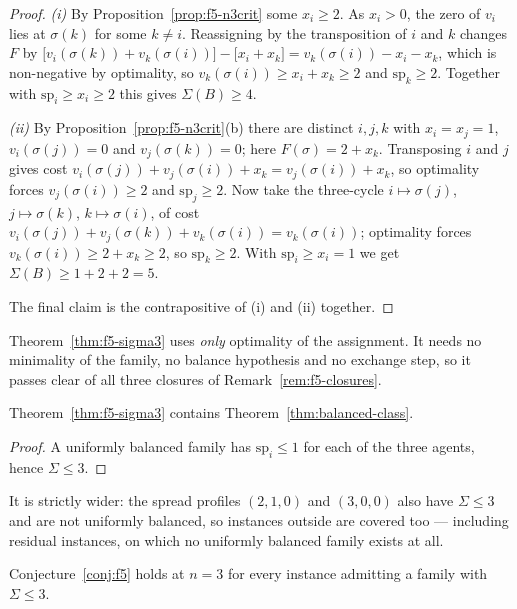 \begin{proof}
\emph{(i)} By Proposition~\ref{prop:f5-n3crit} some $x_i \ge 2$. As $x_i > 0$,
the zero of $v_i$ lies at $\sigma(k)$ for some $k \ne i$. Reassigning by the
transposition of $i$ and $k$ changes $F$ by
$\big[v_i(\sigma(k)) + v_k(\sigma(i))\big] - \big[x_i + x_k\big] =
v_k(\sigma(i)) - x_i - x_k$, which is non-negative by optimality, so
$v_k(\sigma(i)) \ge x_i + x_k \ge 2$ and $\mathrm{sp}_k \ge 2$. Together with
$\mathrm{sp}_i \ge x_i \ge 2$ this gives $\Sigma(B) \ge 4$.

\emph{(ii)} By Proposition~\ref{prop:f5-n3crit}(b) there are distinct $i,j,k$
with $x_i = x_j = 1$, $v_i(\sigma(j)) = 0$ and $v_j(\sigma(k)) = 0$; here
$F(\sigma) = 2 + x_k$. Transposing $i$ and $j$ gives cost
$v_i(\sigma(j)) + v_j(\sigma(i)) + x_k = v_j(\sigma(i)) + x_k$, so optimality
forces $v_j(\sigma(i)) \ge 2$ and $\mathrm{sp}_j \ge 2$. Now take the
three-cycle $i \mapsto \sigma(j)$, $j \mapsto \sigma(k)$, $k \mapsto \sigma(i)$,
of cost
$v_i(\sigma(j)) + v_j(\sigma(k)) + v_k(\sigma(i)) = v_k(\sigma(i))$; optimality
forces $v_k(\sigma(i)) \ge 2 + x_k \ge 2$, so $\mathrm{sp}_k \ge 2$. With
$\mathrm{sp}_i \ge x_i = 1$ we get $\Sigma(B) \ge 1 + 2 + 2 = 5$.

The final claim is the contrapositive of (i) and (ii) together.
\end{proof}

Theorem~\ref{thm:f5-sigma3} uses \emph{only} optimality of the assignment. It
needs no minimality of the family, no balance hypothesis and no exchange step,
so it passes clear of all three closures of Remark~\ref{rem:f5-closures}.

\begin{corollary}
\label{cor:f5-contains-balanced}
Theorem~\ref{thm:f5-sigma3} contains Theorem~\ref{thm:balanced-class}.
\end{corollary}

\begin{proof}
A uniformly balanced family has $\mathrm{sp}_i \le 1$ for each of the three
agents, hence $\Sigma \le 3$.
\end{proof}

It is strictly wider: the spread profiles $(2,1,0)$ and $(3,0,0)$ also have
$\Sigma \le 3$ and are not uniformly balanced, so instances outside
 are covered too --- including residual instances, on which no
uniformly balanced family exists at all.

\begin{corollary}
\label{cor:f5-reduction}
Conjecture~\ref{conj:f5} holds at $n = 3$ for every instance admitting a family
with $\Sigma \le 3$.
\end{corollary}

